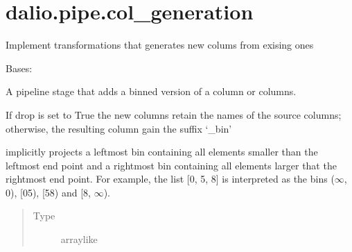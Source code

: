 \documentclass[letterpaper,10pt,english]{sphinxmanual}
\begin{document}
\section{dalio.pipe.col\_generation}
\label{\detokenize{dalio.pipe:module-dalio.pipe.col_generation}}\label{\detokenize{dalio.pipe:dalio-pipe-col-generation}}
Implement transformations that generates new colums from exising ones

\begin{fulllineitems}
\label{\detokenize{dalio.pipe:dalio.pipe.col_generation.Bin}}
Bases: {\hyperref[\detokenize{dalio.pipe:dalio.pipe.col_generation.Custom}]{}}

A pipeline stage that adds a binned version of a column or columns.

If drop is set to True the new columns retain the names of the source
columns; otherwise, the resulting column gain the suffix ‘\_bin’

\begin{fulllineitems}
\label{\detokenize{dalio.pipe:dalio.pipe.col_generation.Bin.bin_map}}
implicitly projects a left\sphinxhyphen{}most bin containing
all elements smaller than the left\sphinxhyphen{}most end point and a right\sphinxhyphen{}most
bin containing all elements larger that the right\sphinxhyphen{}most end point.
For example, the list {[}0, 5, 8{]} is interpreted as
the bins (\sphinxhyphen{}\(\infty\), 0), {[}0\sphinxhyphen{}5), {[}5\sphinxhyphen{}8) and {[}8, \(\infty\)).
\begin{quote}\begin{description}
\item[{Type}] \leavevmode
array\sphinxhyphen{}like

\end{description}\end{quote}


\end{fulllineitems}
\end{fulllineitems}
\end{document}
